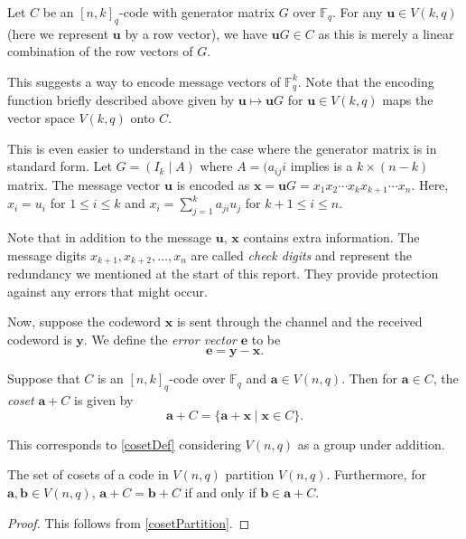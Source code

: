 Let $C$ be an $[n,k]_q$-code with generator matrix $G$ over $\mathbb{F}_q$. For any $\textbf{u}\in V(k,q)$ (here we represent $\textbf{u}$ by a row vector), we have $\textbf{u}G\in C$ as this is merely a linear combination of the row vectors of $G$.

\vspace{2mm}
This suggests a way to encode message vectors of $\mathbb{F}_q^k$. Note that the encoding function briefly described above given by $\textbf{u}\mapsto \textbf{u}G$ for $\textbf{u}\in V(k,q)$ maps the vector space $V(k,q)$ onto $C$.

\vspace{2mm}
This is even easier to understand in the case where the generator matrix is in standard form. Let $G=(I_k\mid A)$ where $A=(a_{ij}i$ implies is a $k\times (n-k)$ matrix.
The message vector $\textbf{u}$ is encoded as $\textbf{x}=\textbf{u}G=x_1x_2\cdots x_kx_{k+1}\cdots x_n$. Here, $x_i=u_i$ for $1\leq i\leq k$ and $x_i=\sum_{j=1}^k a_{ji}u_j$ for $k+1\leq i\leq n$.

\vspace{1mm}
Note that in addition to the message $\textbf{u}$, $\textbf{x}$ contains extra information. The message digits $x_{k+1},x_{k+2},\ldots,x_n$ are called \textit{check digits} and represent the redundancy we mentioned at the start of this report. They provide protection against any errors that might occur.

\vspace{2mm}
Now, suppose the codeword $\textbf{x}$ is sent through the channel and the received codeword is $\textbf{y}$. We define the \textit{error vector} $\textbf{e}$ to be $$\textbf{e}=\textbf{y}-\textbf{x}.$$

\begin{definition}
    Suppose that $C$ is an $[n,k]_q$-code over $\mathbb{F}_q$ and $\textbf{a}\in V(n,q)$. Then for $\textbf{a}\in C$, the \textit{coset} $\textbf{a}+C$ is given by
    $$\textbf{a}+C=\{\textbf{a}+\textbf{x}\mid \textbf{x}\in C\}.$$
\end{definition}

This corresponds to \ref{cosetDef} considering $V(n,q)$ as a group under addition.

\begin{lemma}
    The set of cosets of a code in $V(n,q)$ partition $V(n,q)$. Furthermore, for $\textbf{a},\textbf{b}\in V(n,q)$, $\textbf{a}+C=\textbf{b}+C$ if and only if $\textbf{b}\in \textbf{a}+C$.
\end{lemma}
\begin{proof}
    This follows from \ref{cosetPartition}.
\end{proof}

